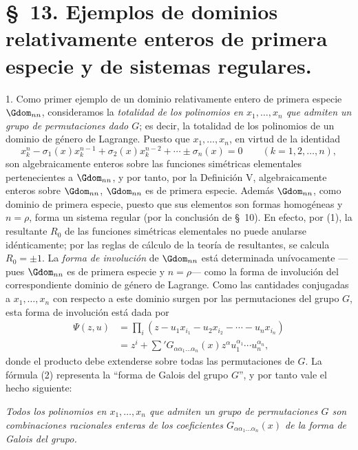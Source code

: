 \documentclass[11pt]{article}
\begin{document}
\section*{\S\ 13. Ejemplos de dominios relativamente enteros de primera especie y de sistemas regulares.}

1. Como primer ejemplo de un dominio relativamente entero de primera especie $\Gdom_{nn}$, consideramos la \emph{totalidad de los polinomios en $x_1,\ldots,x_n$ que admiten un grupo de permutaciones dado $G$}; es decir, la totalidad de los polinomios de un dominio de género de Lagrange. Puesto que $x_1,\ldots,x_n$, en virtud de la identidad
\begin{equation}
  x_k^n-\sigma_1(x)x_k^{n-1}+\sigma_2(x)x_k^{n-2}+\cdots\pm\sigma_n(x)=0
  \qquad(k=1,2,
\ldots,n),
\tag{1}
\end{equation}
son algebraicamente enteros sobre las funciones simétricas elementales pertenecientes a $\Gdom_{nn}$, y por tanto, por la Definición V, algebraicamente enteros sobre $\Gdom_{nn}$, $\Gdom_{nn}$ es de primera especie. Además $\Gdom_{nn}$, como dominio de primera especie, puesto que sus elementos son formas homogéneas y $n=\rho$, forma un sistema regular (por la conclusión de \S\ 10). En efecto, por (1), la resultante $R_0$ de las funciones simétricas elementales no puede anularse idénticamente; por las reglas de cálculo de la teoría de resultantes, se calcula $R_0=\pm1$. La \emph{forma de involución} de $\Gdom_{nn}$ está determinada unívocamente ---pues $\Gdom_{nn}$ es de primera especie y $n=\rho$--- como la forma de involución del correspondiente dominio de género de Lagrange. Como las cantidades conjugadas a $x_1,\ldots,x_n$ con respecto a este dominio surgen por las permutaciones del grupo $G$, esta forma de involución está dada por
\begin{equation}
\begin{aligned}
  \Psi(z,u)&=\prod_i
  (z-u_1x_{i_1}-u_2x_{i_2}-\cdots-u_nx_{i_n})\\
  &=z^i+\sum{}'G_{\alpha\alpha_1\ldots\alpha_n}(x)
  z^\alpha u_1^{\alpha_1}\cdots u_n^{\alpha_n},
\end{aligned}
\tag{2}
\end{equation}
donde el producto debe extenderse sobre todas las permutaciones de $G$. La fórmula (2) representa la ``forma de Galois del grupo $G$'', y por tanto vale el hecho siguiente:

\emph{Todos los polinomios en $x_1,\ldots,x_n$ que admiten un grupo de permutaciones $G$ son combinaciones racionales enteras de los coeficientes $G_{\alpha\alpha_1\ldots\alpha_n}(x)$ de la forma de Galois del grupo.}
\end{document}
